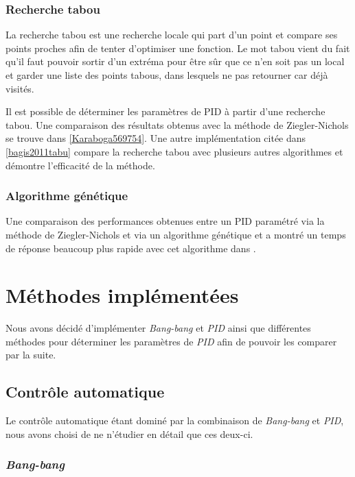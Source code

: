 \documentclass[a4paper,10pt]{report}
\begin{document}

\subsection{Recherche tabou}
La recherche tabou est une recherche locale qui part d'un point et compare ses points proches afin de tenter d'optimiser une fonction.
Le mot tabou vient du fait qu'il faut pouvoir sortir d'un extréma pour être sûr que ce n'en soit pas un local et garder une liste des points tabous, dans lesquels ne pas retourner car déjà visités.

Il est possible de déterminer les paramètres de PID à partir d'une recherche tabou. Une comparaison des résultats obtenus avec la méthode de Ziegler-Nichols se trouve dans \ref{Karaboga569754}. Une autre implémentation citée dans \ref{bagis2011tabu} compare la recherche tabou avec plusieurs autres algorithmes et démontre l'efficacité de la méthode.

\subsection{Algorithme génétique}


Une comparaison des performances obtenues entre un PID paramétré via la méthode de Ziegler-Nichols et via un algorithme génétique et a montré un temps de réponse beaucoup plus rapide avec cet algorithme dans \cite{thomas2009position}.

\chapter{Méthodes implémentées}

Nous avons décidé d'implémenter \textit{Bang-bang} et \textit{PID} ainsi que différentes méthodes pour déterminer les paramètres de \textit{PID} afin de pouvoir les comparer par la suite.

\section{Contrôle automatique}
Le contrôle automatique étant dominé par la combinaison de \textit{Bang-bang} et \textit{PID}, nous avons choisi de ne n'étudier en détail que ces deux-ci.

\subsection{\emph{Bang-bang}}
\end{document}
